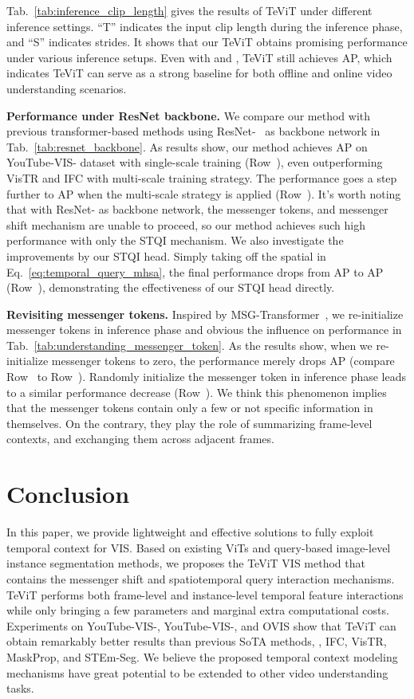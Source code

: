 \documentclass[10pt,twocolumn,letterpaper]{article}
\begin{document}
Tab.~\ref{tab:inference_clip_length} gives the results of TeViT under different inference settings. ``T'' indicates the input clip length during the inference phase, and ``S'' indicates strides. It shows that our TeViT obtains promising performance under various inference setups. Even with  and , TeViT still achieves  AP, which indicates TeViT can serve as a strong baseline for both offline and online video understanding scenarios.

\noindent\textbf{Performance under ResNet backbone.}
We compare our method with previous transformer-based methods using ResNet-~\cite{resnet} as backbone network in Tab.~\ref{tab:resnet_backbone}.
As results show, our method achieves  AP on YouTube-VIS- dataset with single-scale training (Row~), even outperforming VisTR and IFC with multi-scale training strategy.
The performance goes a step further to  AP when the multi-scale strategy is applied (Row~).
It's worth noting that with ResNet- as backbone network, the messenger tokens, and messenger shift mechanism are unable to proceed, so our method achieves such high performance with only the STQI mechanism.
We also investigate the improvements by our STQI head. Simply taking off the spatial  in Eq.~\ref{eq:temporal_query_mhsa}, the final performance drops from  AP to  AP (Row~), demonstrating the effectiveness of our STQI head directly.

\noindent\textbf{Revisiting messenger tokens.}
Inspired by MSG-Transformer~\cite{msgtransformer}, we re-initialize messenger tokens in inference phase and obvious the influence on performance in Tab.~\ref{tab:understanding_messenger_token}.
As the results show, when we re-initialize messenger tokens to zero, the performance merely drops  AP (compare Row~ to Row~).
Randomly initialize the messenger token in inference phase leads to a similar performance decrease (Row~).
We think this phenomenon implies that the messenger tokens contain only a few or not specific information in themselves.
On the contrary, they play the role of summarizing frame-level contexts, and exchanging them across adjacent frames.

\section{Conclusion}
\label{sec:conclusion}

In this paper, we provide lightweight and effective solutions to fully exploit temporal context for VIS. Based on existing ViTs and query-based image-level instance segmentation methods, we proposes the TeViT VIS method that contains the messenger shift and spatiotemporal query interaction mechanisms. TeViT performs both frame-level and instance-level temporal feature interactions while only bringing a few parameters and marginal extra computational costs. Experiments on YouTube-VIS-, YouTube-VIS-, and OVIS show that TeViT can obtain remarkably better results than previous SoTA methods, \eg, IFC, VisTR, MaskProp, and STEm-Seg. We believe the proposed temporal context modeling mechanisms have great potential to be extended to other video understanding tasks.
\end{document}
